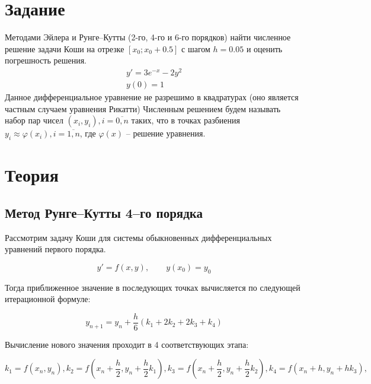 \documentclass[a4paper,12pt]{extarticle}
\begin{document}
    \setcounter{page}{2}
    \tableofcontents
    \vspace{\baselineskip}


    \newpage
    \section{Задание}
    Методами Эйлера и Рунге--Кутты (2-го, 4-го и 6-го порядков) найти численное решение задачи Коши на отрезке $\left [ x_{0}; x_{0} + 0.5 \right ]$ с шагом $h = 0.05$ и оценить погрешность решения. \\
    \begin{equation}\label{eq:01}
    \begin{gathered}
        y' = 3 e^{-x} - 2y^{2} \\
        y(0) = 1
    \end{gathered}
    \end{equation}
    Данное дифференциальное уравнение не разрешимо в квадратурах (оно является частным случаем уравнения Рикатти) \newline
    Численным решением будем называть набор пар чисел $(x_{i},y_{i}), i=\overline{0,n}$ \newline таких, что в точках разбиения $y_{i}\approx \varphi (x_{i}), i=\overline{1,n}$, где $\varphi (x)$ -- решение уравнения.

    \section{Теория}

    \subsection{Метод Рунге--Кутты 4--го порядка}
    Рассмотрим задачу Коши для системы обыкновенных дифференциальных уравнений первого порядка.

    \[
        y' = f(x,y), \qquad y(x_0) = y_0
    \]

    \noindent
    Тогда приближенное значение в последующих точках вычисляется по следующей итерационной формуле:

    \[
        y_{n+1} = y_n + \dfrac{h}{6}(k_1 + 2k_2 + 2k_3 + k_4)
    \]

    \noindent
    Вычисление нового значения проходит в 4 соответствующих этапа:

    \[
        k_1 = f(x_n, y_n), k_2 = f(x_n + \frac{h}{2}, y_n + \frac{h}{2}k_1), k_3 = f(x_n + \frac{h}{2}, y_n + \frac{h}{2}k_2), 	k_4 = f(x_n + h, y_n + hk_3),
    \]
\end{document}
